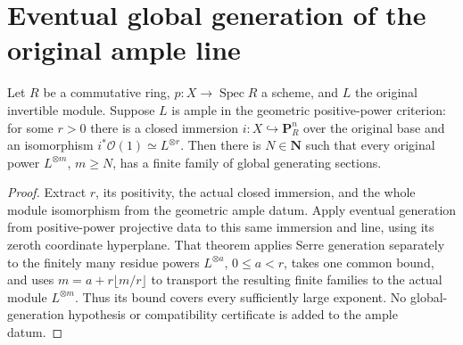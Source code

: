 \section{Eventual global generation of the original ample line}

\begin{lemma}\label{lem:scheme-ample-line-eventual-generation}
\leanok
{}
Let $R$ be a commutative ring, $p:X\to\operatorname{Spec}R$ a scheme,
and $L$ the original invertible module. Suppose $L$ is ample in the geometric
positive-power criterion: for some $r>0$ there is a closed immersion
$i:X\hookrightarrow\mathbf P_R^n$ over the original base and an isomorphism
$i^*\mathcal O(1)\simeq L^{\otimes r}$.
Then there is $N\in\mathbf N$ such that every original power
$L^{\otimes m}$, $m\ge N$, has a finite family of global generating sections.
\end{lemma}

\begin{proof}
Extract $r$, its positivity, the actual closed immersion, and the whole module
isomorphism from the geometric ample datum. Apply eventual generation from
positive-power projective data to this same immersion and line, using its
zeroth coordinate hyperplane. That theorem applies Serre generation separately
to the finitely many residue powers $L^{\otimes a}$, $0\le a<r$, takes one
common bound, and uses $m=a+r\lfloor m/r\rfloor$ to transport the resulting
finite families to the actual module $L^{\otimes m}$. Thus its bound covers
every sufficiently large exponent. No global-generation hypothesis or
compatibility certificate is added to the ample datum.
\end{proof}
